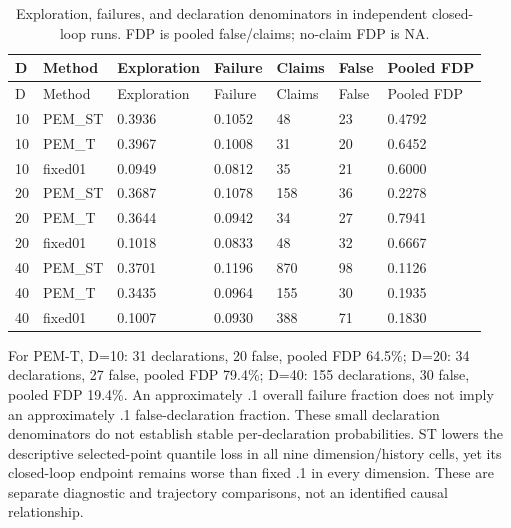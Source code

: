 \documentclass[11pt,a4paper]{article}
\begin{document}
\par\noindent\begin{minipage}{\linewidth}

\begin{longtable}[]{@{}lllllll@{}}
\caption{Exploration, failures, and declaration denominators in
independent closed-loop runs. FDP is pooled false/claims; no-claim FDP
is NA.}\tabularnewline
\toprule
D & Method & Exploration & Failure & Claims & False & Pooled FDP \\
\midrule
\endfirsthead
\toprule
D & Method & Exploration & Failure & Claims & False & Pooled FDP \\
\midrule
\endhead
10 & PEM\_ST & 0.3936 & 0.1052 & 48 & 23 & 0.4792 \\
10 & PEM\_T & 0.3967 & 0.1008 & 31 & 20 & 0.6452 \\
10 & fixed01 & 0.0949 & 0.0812 & 35 & 21 & 0.6000 \\
20 & PEM\_ST & 0.3687 & 0.1078 & 158 & 36 & 0.2278 \\
20 & PEM\_T & 0.3644 & 0.0942 & 34 & 27 & 0.7941 \\
20 & fixed01 & 0.1018 & 0.0833 & 48 & 32 & 0.6667 \\
40 & PEM\_ST & 0.3701 & 0.1196 & 870 & 98 & 0.1126 \\
40 & PEM\_T & 0.3435 & 0.0964 & 155 & 30 & 0.1935 \\
40 & fixed01 & 0.1007 & 0.0930 & 388 & 71 & 0.1830 \\
\bottomrule
\end{longtable}

\end{minipage}\par

For PEM-T, D=10: 31 declarations, 20 false, pooled FDP 64.5\%; D=20: 34
declarations, 27 false, pooled FDP 79.4\%; D=40: 155 declarations, 30
false, pooled FDP 19.4\%. An approximately .1 overall failure fraction
does not imply an approximately .1 false-declaration fraction. These
small declaration denominators do not establish stable per-declaration
probabilities. ST lowers the descriptive selected-point quantile loss in
all nine dimension/history cells, yet its closed-loop endpoint remains
worse than fixed .1 in every dimension. These are separate diagnostic
and trajectory comparisons, not an identified causal relationship.
\end{document}
